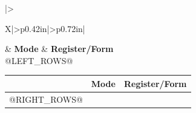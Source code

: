 \par\vspace{5pt}
\begingroup\scriptsize
\setlength{\tabcolsep}{2pt}
\setlength{\arrayrulewidth}{0.35pt}
\renewcommand{\arraystretch}{@ROW_STRETCH@}
\noindent
\begin{minipage}[t]{0.485\linewidth}
\vspace{0pt}
\begin{tabularx}{\linewidth}{|>{\raggedright\arraybackslash}X|>{\centering\arraybackslash}p{0.42in}|>{\centering\arraybackslash}p{0.72in}|}
\hline
{} & \textbf{Mode} & \textbf{Register/Form}\\\hline
@LEFT_ROWS@
\end{tabularx}
\end{minipage}\hfill
\begin{minipage}[t]{0.485\linewidth}
\vspace{0pt}
\begin{tabularx}{\linewidth}{|>{\raggedright\arraybackslash}X|>{\centering\arraybackslash}p{0.42in}|>{\centering\arraybackslash}p{0.72in}|}
\hline
\multicolumn{1}{|c|}{\textbf{Addressing Mode}} & \textbf{Mode} & \textbf{Register/Form}\\\hline
@RIGHT_ROWS@
\end{tabularx}
\end{minipage}
\endgroup\par\vspace{@AFTER_SPACE@}
